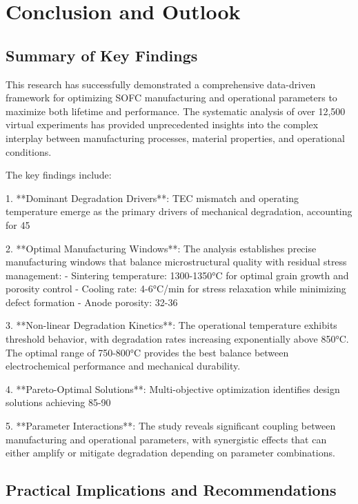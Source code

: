 \documentclass[10pt,conference]{IEEEtran}
\begin{document}
\section{Conclusion and Outlook}

\subsection{Summary of Key Findings}

This research has successfully demonstrated a comprehensive data-driven framework for optimizing SOFC manufacturing and operational parameters to maximize both lifetime and performance. The systematic analysis of over 12,500 virtual experiments has provided unprecedented insights into the complex interplay between manufacturing processes, material properties, and operational conditions.

The key findings include:

1. **Dominant Degradation Drivers**: TEC mismatch and operating temperature emerge as the primary drivers of mechanical degradation, accounting for 45%

2. **Optimal Manufacturing Windows**: The analysis establishes precise manufacturing windows that balance microstructural quality with residual stress management:
   - Sintering temperature: 1300-1350°C for optimal grain growth and porosity control
   - Cooling rate: 4-6°C/min for stress relaxation while minimizing defect formation
   - Anode porosity: 32-36%

3. **Non-linear Degradation Kinetics**: The operational temperature exhibits threshold behavior, with degradation rates increasing exponentially above 850°C. The optimal range of 750-800°C provides the best balance between electrochemical performance and mechanical durability.

4. **Pareto-Optimal Solutions**: Multi-objective optimization identifies design solutions achieving 85-90%

5. **Parameter Interactions**: The study reveals significant coupling between manufacturing and operational parameters, with synergistic effects that can either amplify or mitigate degradation depending on parameter combinations.

\subsection{Practical Implications and Recommendations}
\end{document}
